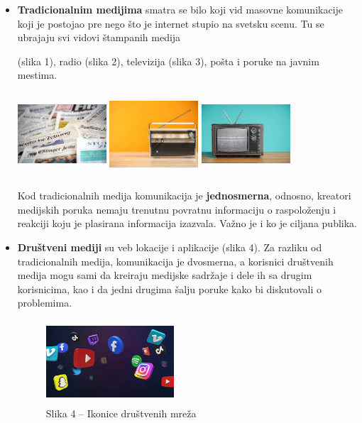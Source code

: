 \documentclass[a4paper]{article}
\begin{document}
\begin{itemize}
	\item \textbf{Tradicionalnim medijima} smatra se bilo koji vid masovne
	komunikacije koji je postojao pre nego što je internet stupio na svetsku
	scenu. Tu se ubrajaju svi vidovi štampanih medija
	
	(slika 1), radio (slika 2), televizija (slika 3), pošta i poruke na
	javnim mestima.
	
	\includegraphics[width=1.3in,height=1.225in]{slika 1.jpg}
	\includegraphics[width=1.3in,height=1.225in]{slika 2.jpg}
	\includegraphics[width=1.3in,height=1.225in]{slika 3.jpg}
	
	Kod tradicionalnih medija komunikacija je \textbf{jednosmerna}, odnosno,
	kreatori medijskih poruka nemaju trenutnu povratnu informaciju o
	raspoloženju i reakciji koju je plasirana informacija izazvala. Važno je
	i ko je ciljana publika.
	
	\item \textbf{Društveni mediji} su veb lokacije i aplikacije (slika 4). Za
	razliku od tradicionalnih medija, komunikacija je dvosmerna, a korisnici
	društvenih medija mogu sami da kreiraju medijske sadržaje i dele ih sa
	drugim korisnicima, kao i da jedni drugima šalju poruke kako bi
	diskutovali o problemima.
	
	\begin{figure}[h!]
		\begin{center}
			\includegraphics[width=1.87842in,height=1.225in]{slika4.jpg}
		\end{center}
		\caption {Slika 4 – Ikonice društvenih mreža}
	\end{figure}


\end{itemize}
\end{document}
